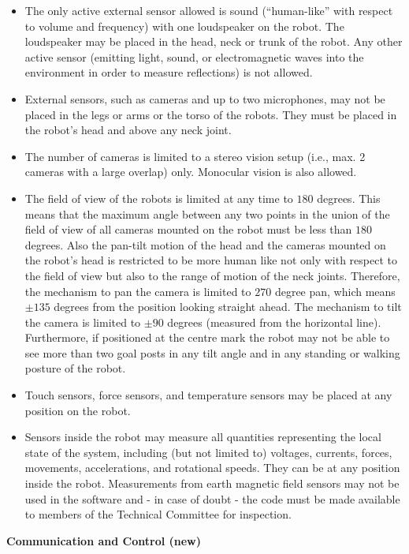 \begin{itemize}
\item The only active external sensor allowed is sound
(``human-like'' with respect to volume and frequency) with one loudspeaker on the robot. The loudspeaker may be placed in the head, neck or trunk of the robot. Any
other active sensor (emitting light, sound, or electromagnetic waves into the environment in order to measure reflections) is not allowed. 
\item External sensors, such as cameras and up to two microphones, may not be placed in the legs or arms or the
torso of the robots. They must be placed in the robot's
head and above any neck joint. 
\item The number of cameras is limited to a stereo vision setup (i.e., max. 2 cameras with a large overlap) only. Monocular vision is also allowed.
\item The field of view of the robots is limited at any time to $180$ degrees. This means that the maximum angle between any two points in the union of the field of view of all cameras mounted on the robot must be less than $180$ degrees. Also the pan-tilt motion of the head and the cameras mounted on the robot's head is restricted to be more human like not only with respect to the field of view but also to the range of motion of the neck joints. Therefore, the mechanism to pan the camera is limited to $270$ degree pan, which means $\pm135$ degrees from the position looking straight ahead. The mechanism to tilt the camera is limited to $\pm90$ degrees (measured from the horizontal line). Furthermore, if positioned at the centre mark the robot may not be able to see more than two goal posts in any tilt angle and in any standing or walking posture of the robot. 
\item Touch sensors, force sensors, and temperature sensors may be placed at any position on the robot.
\item Sensors inside the robot may measure all quantities representing the local state of the system, including (but not limited to) voltages, currents, forces, movements, accelerations, and rotational speeds. They can be at any position inside the robot. Measurements from earth magnetic field sensors may not be used in the software and - in case of doubt - the code must be made available to members of the Technical Committee for inspection.
\end{itemize}

{\bfseries Communication and Control (new)}

